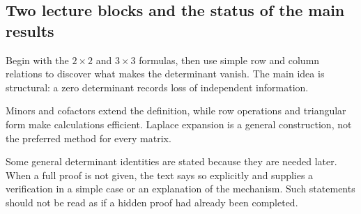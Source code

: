 \subsection{Two lecture blocks and the status of the main results}

\begin{corebox}
Begin with the $2\times2$ and $3\times3$ formulas, then use simple row and column relations to discover what makes the determinant vanish. The main idea is structural: a zero determinant records loss of independent information.
\end{corebox}

\begin{corebox}
Minors and cofactors extend the definition, while row operations and triangular form make calculations efficient. Laplace expansion is a general construction, not the preferred method for every matrix.
\end{corebox}

Some general determinant identities are stated because they are needed later. When a full proof is not given, the text says so explicitly and supplies a verification in a simple case or an explanation of the mechanism. Such statements should not be read as if a hidden proof had already been completed.
